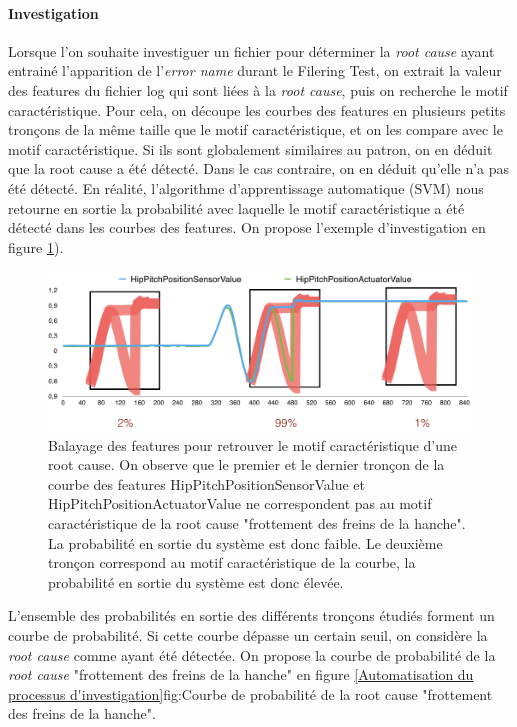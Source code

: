 \paragraph{Investigation}
Lorsque l'on souhaite investiguer un fichier pour déterminer la \emph{root cause} ayant entrainé l'apparition de l'\emph{error name} durant le Filering Test, on extrait la valeur des features du fichier log qui sont liées à la \emph{root cause}, puis on recherche le motif caractéristique. Pour cela, on découpe les courbes des features en plusieurs petits tronçons de la même taille que le motif caractéristique, et on les compare avec le motif caractéristique. Si ils sont globalement similaires au patron, on en déduit que la root cause a été détecté. Dans le cas contraire, on en déduit qu'elle n'a pas été détecté. En réalité, l'algorithme d'apprentissage automatique (SVM) nous retourne en sortie la probabilité avec laquelle le motif caractéristique a été détecté dans les courbes des features. On propose l'exemple d'investigation en figure \ref{fig:Balayage des features pour retrouver le motif caractéristique d'une root cause}).

\begin{figure}[h]
	\centering\includegraphics[width=12cm]{images/balayage_motif.png}
	\caption[Balayage des features pour retrouver le motif caractéristique d'une root cause]{Balayage des features pour retrouver le motif caractéristique d'une root cause. On observe que le premier et le dernier tronçon de la courbe des features HipPitchPositionSensorValue et  HipPitchPositionActuatorValue ne correspondent pas au motif caractéristique de la root cause "frottement des freins de la hanche". La probabilité en sortie du système est donc faible. Le deuxième tronçon correspond au motif caractéristique de la courbe, la probabilité en sortie du système est donc élevée.}
	\label{fig:Balayage des features pour retrouver le motif caractéristique d'une root cause}
\end{figure}

L'ensemble des probabilités en sortie des différents tronçons étudiés forment un courbe de probabilité. Si cette courbe dépasse un certain seuil, on considère la \emph{root cause} comme ayant été détectée. On propose la courbe de probabilité de la \emph{root cause} "frottement des freins de la hanche" en figure 	\ref{Automatisation du processus d'investigation}{fig:Courbe de probabilité de la root cause "frottement des freins de la hanche"}.

